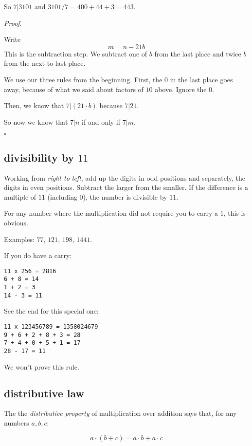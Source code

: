 \documentclass[11pt, oneside]{article}
\begin{document}
So $7|3101$ and $3101/7 = 400 + 44 + 3 = 443$.

\emph{Proof}.

Write
\[ m = n - 21b \]
This is the subtraction step.  We subtract one of $b$ from the last place and twice $b$ from the next to last place.  

We use our three rules from the beginning.  First, the $0$ in the last place goes away, because of what we said about factors of $10$ above.  Ignore the $0$.

Then, we know that $7|(21 \cdot b)$ because $7|21$.  

So now we know that $7|n$ if and only if $7|m$.

$\square$

\subsection*{divisibility by $11$}

Working from \emph{right to left}, add up the digits in odd positions and separately, the digits in even positions.  Subtract the larger from the smaller.  If the difference is a multiple of $11$ (including $0$), the number is divisible by $11$.

For any number where the multiplication did not require you to carry a $1$, this is obvious.

Examples:  $77$, $121$, $198$, $1441$.

If you do have a carry:

\begin{verbatim}
11 x 256 = 2816
6 + 8 = 14
1 + 2 = 3
14 - 3 = 11
\end{verbatim}

See the end for this special one:

\begin{verbatim}
11 x 123456789 = 1358024679
9 + 6 + 2 + 8 + 3 = 28
7 + 4 + 0 + 5 + 1 = 17
28 - 17 = 11
\end{verbatim}

We won't prove this rule.

\subsection*{distributive law}

The the \emph{distributive property} of multiplication over addition says that, for any numbers $a,b,c$:

\[ a \cdot (b+c) = a \cdot b + a \cdot c \]
\end{document}
